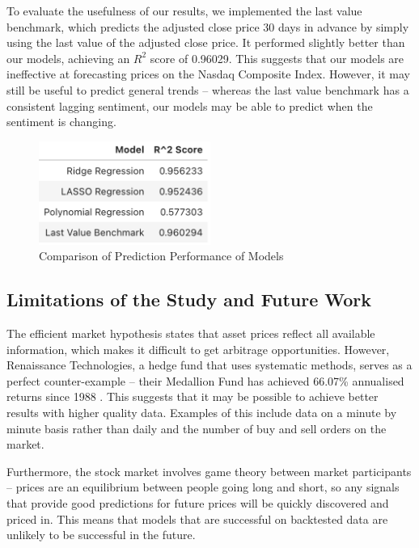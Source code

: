 \documentclass[a4paper, 11pt]{article}
\begin{document}
To evaluate the usefulness of our results, we implemented the last value benchmark, which predicts the adjusted close price 30 days in advance by simply using the last value of the adjusted close price. It performed slightly better than our models, achieving an $R^2$ score of 0.96029. This suggests that our models are ineffective at forecasting prices on the Nasdaq Composite Index. However, it may still be useful to predict general trends -- whereas the last value benchmark has a consistent lagging sentiment, our models may be able to predict when the sentiment is changing.

\begin{figure}[H]
    \begin{center}
        \includegraphics[width=0.5\textwidth]{Model Results Table.png}
        \caption{Comparison of Prediction Performance of Models}
    \end{center}
\end{figure}

\subsection{Limitations of the Study and Future Work}
The efficient market hypothesis states that asset prices reflect all available information, which makes it difficult to get arbitrage opportunities. However, Renaissance Technologies, a hedge fund that uses systematic methods, serves as a perfect counter-example -- their Medallion Fund has achieved 66.07\% annualised returns since 1988 \cite{cornell2020medallion}. This suggests that it may be possible to achieve better results with higher quality data. Examples of this include data on a minute by minute basis rather than daily and the number of buy and sell orders on the market.

Furthermore, the stock market involves game theory between market participants -- prices are an equilibrium between people going long and short, so any signals that provide good predictions for future prices will be quickly discovered and priced in. This means that models that are successful on backtested data are unlikely to be successful in the future.
\end{document}
